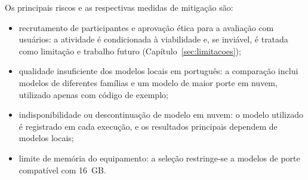 \documentclass[
    12pt,                   %
    openright,              %
    oneside,                %
    a4paper,                %
    sumario=tradicional,    %
    english,                %
    brazil,                 %
    ]{abntex2}
\begin{document}
Os principais riscos e as respectivas medidas de mitigação são:

\begin{itemize}
  \item recrutamento de participantes e aprovação ética para a avaliação com usuários: a atividade é condicionada à viabilidade e, se inviável, é tratada como limitação e trabalho futuro (Capítulo~\ref{sec:limitacoes});
  \item qualidade insuficiente dos modelos locais em português: a comparação inclui modelos de diferentes famílias e um modelo de maior porte em nuvem, utilizado apenas com código de exemplo;
  \item indisponibilidade ou descontinuação de modelo em nuvem: o modelo utilizado é registrado em cada execução, e os resultados principais dependem de modelos locais;
  \item limite de memória do equipamento: a seleção restringe-se a modelos de porte compatível com 16~GB.
\end{itemize}


\postextual


%
\printbibliography

%
%
%
%
%
%
%
%
%
%
\end{document}
